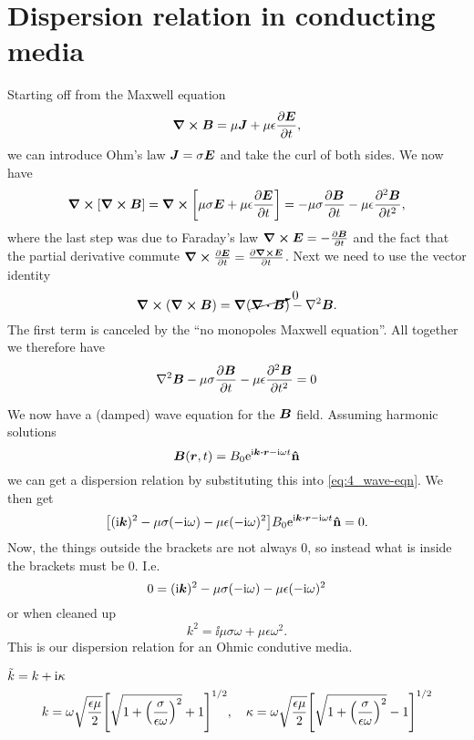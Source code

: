 \documentclass[11pt,letter, swedish, english
]{article}
\begin{document}
\section{Dispersion relation in conducting media}
Starting off from the Maxwell equation
\begin{equation}
\curl\vb*B = \mu\vb*J + \mu\epsilon\pdv{\vb*E}{t},
\end{equation}
we can introduce Ohm's law $\vb*J=\sigma\vb*E$ and take the curl of
both sides. We now have
\begin{equation}\label{eq:4_wave-eqn}
\curl[\curl\vb*B] = 
\curl\qty[\mu\sigma\vb*E + \mu\epsilon\pdv{\vb*E}{t}]
=-\mu\sigma\pdv{\vb*B}{t} - \mu\epsilon\pdv[2]{\vb*B}{t},
\end{equation}
where the last step was due to Faraday's law 
$\curl\vb*E = -\pdv{\vb*B}{t}$ and the fact that the partial
derivative commute $\curl\pdv{\vb*E}{t} = \pdv{\curl\vb*E}{t}$. 
Next we need to use the vector identity
\begin{equation}
\curl(\curl\vb*B) = \grad{}(\cancelto{0}{\div\vb*B}) - \laplacian\vb*B.
\end{equation}
The first term is canceled by the ``no monopoles Maxwell
equation''. All together we therefore have
\begin{equation}\label{eq:4_wave-eqn}
\laplacian\vb*B
-\mu\sigma\pdv{\vb*B}{t} - \mu\epsilon\pdv[2]{\vb*B}{t} =0
\end{equation}

We now have a (damped) wave equation for the $\vb*B$ field. Assuming
harmonic solutions
\begin{equation}
\vb*B(\vb*r, t) = B_0\ee^{\ii\vb*k\vdot\vb*r - \ii\omega t}\vu{n}
\end{equation}
we can get a dispersion relation by substituting this into
\eqref{eq:4_wave-eqn}. We then get
\begin{equation}
\qty[(\ii\vb*k)^2
-\mu\sigma(-\ii\omega) - \mu\epsilon(-\ii\omega)^2
]B_0\ee^{\ii\vb*k\vdot\vb*r - \ii\omega t}\vu{n} =0.
\end{equation}
Now, the things outside the brackets are not always 0, so instead what
is inside the brackets must be 0. I.e.
\begin{equation}
0=(\mathrm{i}\vb*k)^2
-\mu\sigma(-\mathrm{i}\omega) - \mu\epsilon(-\mathrm{i}\omega)^2
\end{equation}
or when cleaned up
\begin{equation}
k^2 = \ii\mu\sigma\omega +\mu\epsilon\omega^2.
\end{equation}
This is our dispersion relation for an Ohmic condutive media. 




$\tilde{k}=k+\mathrm{i}\kappa$
\begin{equation}\label{eq:4_ktilde}
k=\omega\sqrt{\frac{\epsilon\mu}{2}}
\qty[\sqrt{1+\qty(\frac{\sigma}{\epsilon\omega})^2}+1]^{1/2}
\qcomma
\kappa=\omega\sqrt{\frac{\epsilon\mu}{2}}
\qty[\sqrt{1+\qty(\frac{\sigma}{\epsilon\omega})^2}-1]^{1/2}
\end{equation}
\end{document}
